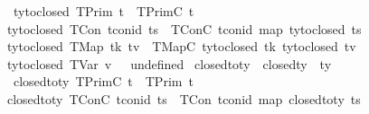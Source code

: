 \begin{isabellebody}
\ \ \ \ {\isachardoublequoteopen}ty{\isacharunderscore}{\kern0pt}to{\isacharunderscore}{\kern0pt}closed\ {\isacharparenleft}{\kern0pt}TPrim\ t{\isacharparenright}{\kern0pt}\ {\isacharequal}{\kern0pt}\ TPrimC\ t{\isachardoublequoteclose}\isanewline
\ {\isacharbar}{\kern0pt}\ \ {\isachardoublequoteopen}ty{\isacharunderscore}{\kern0pt}to{\isacharunderscore}{\kern0pt}closed\ {\isacharparenleft}{\kern0pt}TCon\ tcon{\isacharunderscore}{\kern0pt}id\ ts{\isacharparenright}{\kern0pt}\ {\isacharequal}{\kern0pt}\ TConC\ tcon{\isacharunderscore}{\kern0pt}id\ {\isacharparenleft}{\kern0pt}map\ ty{\isacharunderscore}{\kern0pt}to{\isacharunderscore}{\kern0pt}closed\ ts{\isacharparenright}{\kern0pt}{\isachardoublequoteclose}\isanewline
\ {\isacharbar}{\kern0pt}\ \ {\isachardoublequoteopen}ty{\isacharunderscore}{\kern0pt}to{\isacharunderscore}{\kern0pt}closed\ {\isacharparenleft}{\kern0pt}TMap\ tk\ tv{\isacharparenright}{\kern0pt}\ {\isacharequal}{\kern0pt}\ TMapC\ {\isacharparenleft}{\kern0pt}ty{\isacharunderscore}{\kern0pt}to{\isacharunderscore}{\kern0pt}closed\ tk{\isacharparenright}{\kern0pt}\ {\isacharparenleft}{\kern0pt}ty{\isacharunderscore}{\kern0pt}to{\isacharunderscore}{\kern0pt}closed\ tv{\isacharparenright}{\kern0pt}{\isachardoublequoteclose}\isanewline
\ {\isacharbar}{\kern0pt}\ \ {\isachardoublequoteopen}ty{\isacharunderscore}{\kern0pt}to{\isacharunderscore}{\kern0pt}closed\ {\isacharparenleft}{\kern0pt}TVar\ v{\isacharparenright}{\kern0pt}\ {\isacharequal}{\kern0pt}\ \ undefined{\isachardoublequoteclose}\isanewline
\isanewline
{}\isamarkupfalse%
\ closed{\isacharunderscore}{\kern0pt}to{\isacharunderscore}{\kern0pt}ty\ {\isacharcolon}{\kern0pt}{\isacharcolon}{\kern0pt}\ {\isachardoublequoteopen}closed{\isacharunderscore}{\kern0pt}ty\ {\isasymRightarrow}\ ty{\isachardoublequoteclose}\isanewline
\ \ \ \isanewline
\ \ \ \ {\isachardoublequoteopen}closed{\isacharunderscore}{\kern0pt}to{\isacharunderscore}{\kern0pt}ty\ {\isacharparenleft}{\kern0pt}TPrimC\ t{\isacharparenright}{\kern0pt}\ {\isacharequal}{\kern0pt}\ TPrim\ t{\isachardoublequoteclose}\isanewline
\ {\isacharbar}{\kern0pt}\ \ {\isachardoublequoteopen}closed{\isacharunderscore}{\kern0pt}to{\isacharunderscore}{\kern0pt}ty\ {\isacharparenleft}{\kern0pt}TConC\ tcon{\isacharunderscore}{\kern0pt}id\ ts{\isacharparenright}{\kern0pt}\ {\isacharequal}{\kern0pt}\ TCon\ tcon{\isacharunderscore}{\kern0pt}id\ {\isacharparenleft}{\kern0pt}map\ closed{\isacharunderscore}{\kern0pt}to{\isacharunderscore}{\kern0pt}ty\ ts{\isacharparenright}{\kern0pt}{\isachardoublequoteclose}\isanewline

\end{isabellebody}
